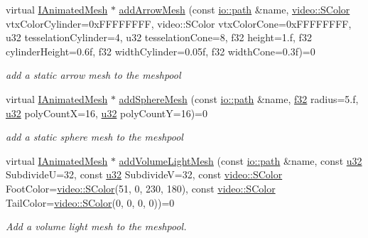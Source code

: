 \begin{DoxyCompactItemize}
virtual \hyperlink{classirr_1_1scene_1_1IAnimatedMesh}{I\+Animated\+Mesh} $\ast$ \hyperlink{classirr_1_1scene_1_1ISceneManager_ac1bca43a6301e6c9daf09806ea46309a}{add\+Arrow\+Mesh} (const \hyperlink{namespaceirr_1_1io_a6468281622ce3a1c46b72e19f32dded5}{io\+::path} \&name, \hyperlink{classirr_1_1video_1_1SColor}{video\+::\+S\+Color} vtx\+Color\+Cylinder=0x\+F\+F\+F\+F\+F\+F\+F\+F, video\+::\+S\+Color vtx\+Color\+Cone=0x\+F\+F\+F\+F\+F\+F\+F\+F, u32 tesselation\+Cylinder=4, u32 tesselation\+Cone=8, f32 height=1.\+f, f32 cylinder\+Height=0.\+6f, f32 width\+Cylinder=0.\+05f, f32 width\+Cone=0.\+3f)=0
\begin{DoxyCompactList}\small\item\em add a static arrow mesh to the meshpool \end{DoxyCompactList}\item 
virtual \hyperlink{classirr_1_1scene_1_1IAnimatedMesh}{I\+Animated\+Mesh} $\ast$ \hyperlink{classirr_1_1scene_1_1ISceneManager_a9e9e8524055ca841c0bb16316f4b8212}{add\+Sphere\+Mesh} (const \hyperlink{namespaceirr_1_1io_a6468281622ce3a1c46b72e19f32dded5}{io\+::path} \&name, \hyperlink{namespaceirr_a0277be98d67dc26ff93b1a6a1d086b07}{f32} radius=5.f, \hyperlink{namespaceirr_a0416a53257075833e7002efd0a18e804}{u32} poly\+CountX=16, \hyperlink{namespaceirr_a0416a53257075833e7002efd0a18e804}{u32} poly\+CountY=16)=0
\begin{DoxyCompactList}\small\item\em add a static sphere mesh to the meshpool \end{DoxyCompactList}\item 
virtual \hyperlink{classirr_1_1scene_1_1IAnimatedMesh}{I\+Animated\+Mesh} $\ast$ \hyperlink{classirr_1_1scene_1_1ISceneManager_a7086c554b86bdf055d6ebcc5950e1f16}{add\+Volume\+Light\+Mesh} (const \hyperlink{namespaceirr_1_1io_a6468281622ce3a1c46b72e19f32dded5}{io\+::path} \&name, const \hyperlink{namespaceirr_a0416a53257075833e7002efd0a18e804}{u32} SubdivideU=32, const \hyperlink{namespaceirr_a0416a53257075833e7002efd0a18e804}{u32} SubdivideV=32, const \hyperlink{classirr_1_1video_1_1SColor}{video\+::\+S\+Color} Foot\+Color=\hyperlink{classirr_1_1video_1_1SColor}{video\+::\+S\+Color}(51, 0, 230, 180), const \hyperlink{classirr_1_1video_1_1SColor}{video\+::\+S\+Color} Tail\+Color=\hyperlink{classirr_1_1video_1_1SColor}{video\+::\+S\+Color}(0, 0, 0, 0))=0
\begin{DoxyCompactList}\small\item\em Add a volume light mesh to the meshpool. \end{DoxyCompactList}\item 

\end{DoxyCompactItemize}
